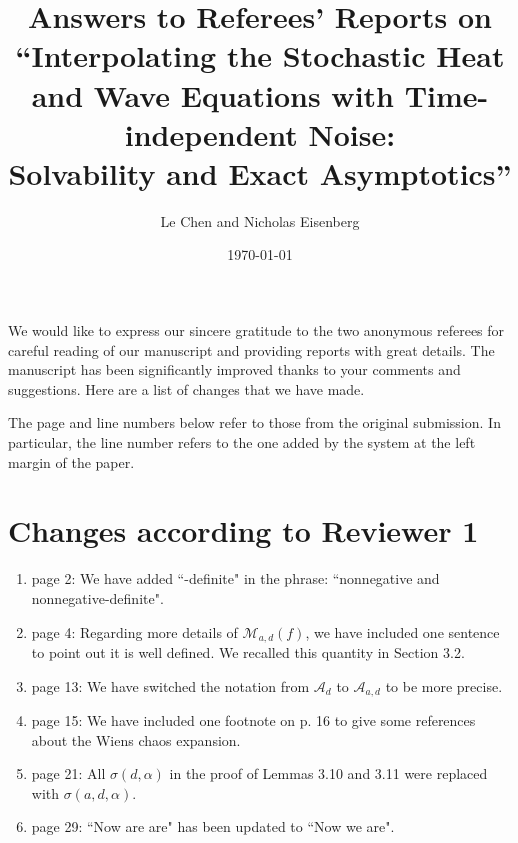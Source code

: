 \documentclass[12pt]{article}%
\title{Answers to Referees' Reports on\\
``Interpolating the Stochastic Heat and Wave Equations with Time-independent Noise:\\
Solvability and Exact Asymptotics''}
\author{Le Chen and Nicholas Eisenberg}
\date{\today}
\theoremstyle{plain}
\theoremstyle{definition}
\numberwithin{equation}{section}
\begin{document}
\maketitle


We would like to express our sincere gratitude to the two anonymous referees
for careful reading of our manuscript and providing reports with great details.
The manuscript has been significantly improved thanks to your comments and
suggestions. Here are a list of changes that we have made.

\bigskip

The page and line numbers below refer to those from the original submission. In
particular, the line number refers to the one added by the system at the left
margin of the paper.

\section{Changes according to Reviewer 1}

\begin{enumerate}
  \item[1.] page 2: We have added ``-definite" in the phrase: ``nonnegative and
    nonnegative-definite".
  \item[2.] page 4: Regarding more details of $\mathcal{M}_{a,d}(f)$, we have
    included one sentence to point out it is well defined. We recalled this
    quantity in Section 3.2.
  \item[3.] page 13: We have switched the notation from $\mathcal{A}_{d}$ to
    $\mathcal{A}_{a,d}$ to be more precise.
  \item[4.] page 15: We have included one footnote on p. 16 to give some references
    about the Wiens chaos expansion.
  \item[5.] page 21: All $\sigma(d,\alpha)$ in the proof of Lemmas 3.10 and 3.11
    were replaced with $\sigma(a,d,\alpha)$.
  \item[6.] page 29: ``Now are are" has been updated to ``Now we are".
\end{enumerate}
\end{document}
